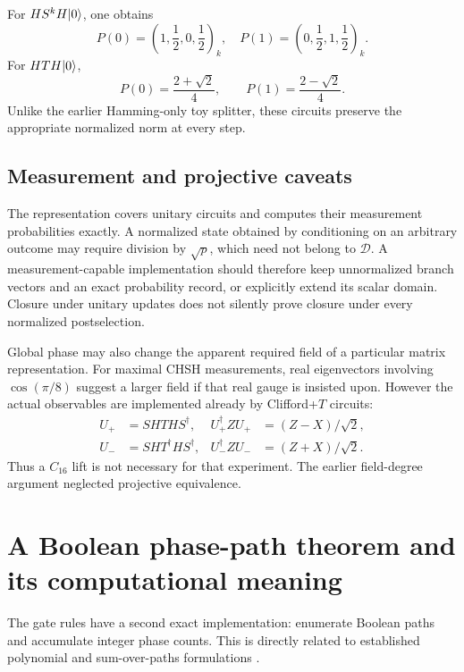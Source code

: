 For $H S^k H\lvert 0\rangle$, one obtains
\begin{equation}
 P(0)=\left(1,\frac12,0,\frac12\right)_k,\quad
 P(1)=\left(0,\frac12,1,\frac12\right)_k.
\end{equation}
For $HTH\lvert 0\rangle$,
\begin{equation}
 P(0)=\frac{2+\sqrt2}{4},\qquad P(1)=\frac{2-\sqrt2}{4}.
\end{equation}
Unlike the earlier Hamming-only toy splitter, these circuits preserve the appropriate normalized norm at every step.

\subsection{Measurement and projective caveats}
The representation covers unitary circuits and computes their measurement probabilities exactly. A normalized state obtained by conditioning on an arbitrary outcome may require division by $\sqrt p$, which need not belong to $\mathcal D$. A measurement-capable implementation should therefore keep unnormalized branch vectors and an exact probability record, or explicitly extend its scalar domain. Closure under unitary updates does not silently prove closure under every normalized postselection.

Global phase may also change the apparent required field of a particular matrix representation. For maximal CHSH measurements, real eigenvectors involving $\cos(\pi/8)$ suggest a larger field if that real gauge is insisted upon. However the actual observables are implemented already by Clifford+$T$ circuits:
\begin{align}
 U_+&=SHTHS^\dagger,& U_+^\dagger ZU_+&=(Z-X)/\sqrt2,\\
 U_-&=SHT^\dagger HS^\dagger,& U_-^\dagger ZU_-&=(Z+X)/\sqrt2.
\end{align}
Thus a $C_{16}$ lift is not necessary for that experiment. The earlier field-degree argument neglected projective equivalence.

\section{A Boolean phase-path theorem and its computational meaning}\label{sec:paths}
The gate rules have a second exact implementation: enumerate Boolean paths and accumulate integer phase counts. This is directly related to established polynomial and sum-over-paths formulations \cite{dawson,amy2019,amy2023}.

